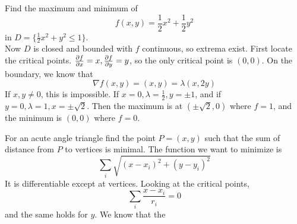 \documentclass[12pt]{article}
\begin{document}
\begin{ex}
    Find the maximum and minimum of
    $$f(x,y) = \frac{1}{2}x^2 + \frac{1}{2}y^2$$
    in $D = \{\frac{1}{2}x^2 + y^2 \le 1\}$. \\
    Now $D$ is closed and bounded with $f$ continuous, so extrema exist. First locate the critical points. $\frac{\partial f}{\partial x} = x, \frac{\partial f}{\partial y} = y$, so the only critical point is $(0,0)$. On the boundary, we know that
    $$\nabla f(x,y) = (x,y) = \lambda(x,2y)$$
    If $x,y \ne 0$, this is impossible. If $x = 0, \lambda = \frac{1}{2}, y = \pm 1$, and if $y = 0, \lambda = 1, x = \pm \sqrt 2$. Then the maximum is at $(\pm\sqrt 2, 0)$ where $f=1$, and the minimum is $(0,0)$ where $f=0$.
\end{ex}

\begin{ex}
    For an acute angle triangle find the point $P = (x,y)$ such that the sum of distance from $P$ to vertices is minimal. The function we want to minimize is
    $$\sum_i \sqrt{(x - x_i)^2 + (y - y_i)^2}$$
    It is differentiable except at vertices. Looking at the critical points,
    $$\sum_i \frac{x - x_i}{r_i} = 0$$
    and the same holds for $y$. We know that the 
\end{ex}
\end{document}
